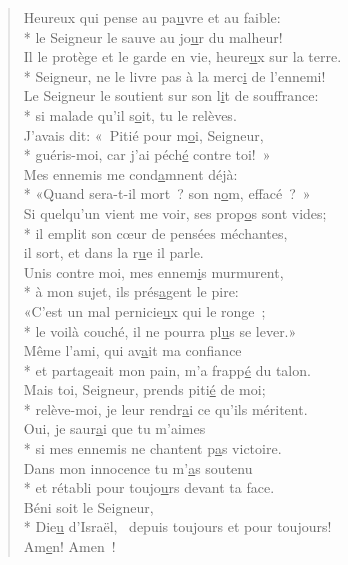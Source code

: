 
\begin{verse}
Heureux qui pense au pa\underline{u}vre et au faible: \\*
le Seigneur le sauve au jo\underline{u}r du malheur! \\
Il le protège et le garde en vie, heure\underline{u}x sur la terre. \\*
Seigneur, ne le livre pas à la merc\underline{i} de l’ennemi! \\
Le Seigneur le soutient sur son l\underline{i}t de souffrance: \\*
si malade qu’il s\underline{o}it, tu le relèves. \\

J’avais dit: « Pitié pour m\underline{o}i, Seigneur, \\*
guéris-moi, car j’ai péch\underline{é} contre toi! » \\
Mes ennemis me cond\underline{a}mnent déjà: \\*
«Quand sera-t-il mort ? son n\underline{o}m, effacé ? » \\
Si quelqu’un vient me voir, ses prop\underline{o}s sont vides; \\*
il emplit son cœur de pensées méchantes, \\
il sort, et dans la r\underline{u}e il parle. \\

Unis contre moi, mes ennem\underline{i}s murmurent, \\*
à mon sujet, ils prés\underline{a}gent le pire: \\
«C’est un mal pernicie\underline{u}x qui le ronge ; \\*
le voilà couché, il ne pourra pl\underline{u}s se lever.» \\
Même l’ami, qui av\underline{a}it ma confiance \\*
et partageait mon pain, m’a frapp\underline{é} du talon. \\

Mais toi, Seigneur, prends piti\underline{é} de moi; \\*
relève-moi, je leur rendr\underline{a}i ce qu’ils méritent. \\
Oui, je saur\underline{a}i que tu m’aimes \\*
si mes ennemis ne chantent p\underline{a}s victoire. \\
Dans mon innocence tu m’\underline{a}s soutenu \\*
et rétabli pour toujo\underline{u}rs devant ta face. \\

Béni soit le Seigneur, \\*
Die\underline{u} d’Israël,~\psalmstar
depuis toujours et pour toujours! \\
Am\underline{e}n! Amen ! \\
\end{verse}

